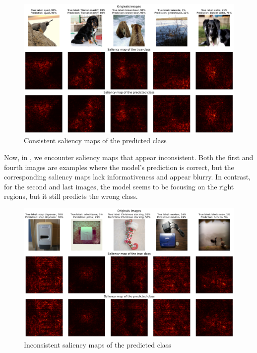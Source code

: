 \begin{figure}[H]
    \centering
    \includegraphics[width=.9\textwidth]{good_saliency_map.pdf}
    \caption{Consistent saliency maps of the predicted class}
    \label{fig:good_saliency_map}
\end{figure}

Now, in , we encounter saliency maps that appear inconsistent. Both the first and fourth images are examples where the model's prediction is correct, but the corresponding saliency maps lack informativeness and appear blurry. In contrast, for the second and last images, the model seems to be focusing on the right regions, but it still predicts the wrong class.

\begin{figure}[H]
    \centering  
    \includegraphics[width=.9\textwidth]{bad_saliency_map.pdf}
    \caption{Inconsistent saliency maps of the predicted class}
    \label{fig:bad_saliency_map}
\end{figure}



